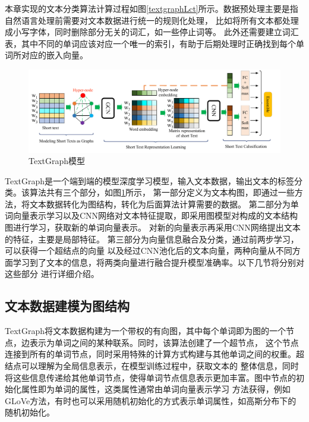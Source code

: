 本章实现的文本分类算法计算过程如图\ref{textgraphLct}所示。数据预处理主要是指自然语言处理前需要对文本数据进行统一的规则化处理，
比如将所有文本都处理成小写字体，同时删除部分无关的词汇，如一些停止词等。
此外还需要建立词汇表，其中不同的单词应该对应一个唯一的索引，有助于后期处理时正确找到每个单词所对应的嵌入向量。
\begin{figure}[htb]%
	\setlength{\belowcaptionskip}{0pt}
	\centering
	\includegraphics[width=1\textwidth]{pic/TextGraph-arch.pdf}
	\caption{TextGraph模型}
	\label{TextGraph}
\end{figure}

TextGraph是一个端到端的模型深度学习模型，输入文本数据，输出文本的标签分类。该算法共有三个部分，如图\ref{TextGraph}所示，
第一部分定义为文本构图，即通过一些方法，将文本数据转化为图结构，转化为后面算法计算需要的数据。
第二部分为单词向量表示学习以及CNN网络对文本特征提取，即采用图模型对构成的文本结构图进行学习，获取新的单词向量表示。
对新的向量表示再采用CNN网络提出文本的特征，主要是局部特征。
第三部分为向量信息融合及分类，通过前两步学习，可以获得一个超结点的向量
以及经过CNN池化后的文本向量，两种向量从不同方面学习到了文本的信息，将两类向量进行融合提升模型准确率。以下几节将分别对这些部分
进行详细介绍。
\subsection{文本数据建模为图结构}
TextGraph将文本数据构建为一个带权的有向图，其中每个单词即为图的一个节点，边表示为单词之间的某种联系。同时，该算法创建了一个超节点，
这个节点连接到所有的单词节点，同时采用特殊的计算方式构建与其他单词之间的权重。超结点可以理解为全局信息表示，在模型训练过程中，获取文本的
整体信息，同时将这些信息传递给其他单词节点，使得单词节点信息表示更加丰富。图中节点的初始化属性即为单词的属性，这类属性通常由单词向量表示学习
方法获得，例如GLoVe方法，有时也可以采用随机初始化的方式表示单词属性，如高斯分布下的随机初始化。

